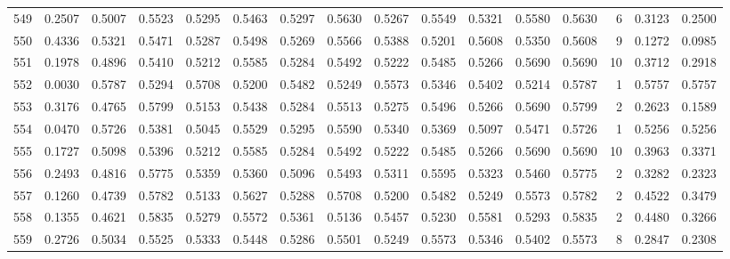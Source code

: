 \begin{tabular}{lrrrrrrrrrrrrrrr}
549 &      0.2507 &  0.5007 &  0.5523 &  0.5295 &  0.5463 &  0.5297 &  0.5630 &  0.5267 &  0.5549 &  0.5321 &   0.5580 &     0.5630 &      6 &                    0.3123 &                     0.2500 \\
550 &      0.4336 &  0.5321 &  0.5471 &  0.5287 &  0.5498 &  0.5269 &  0.5566 &  0.5388 &  0.5201 &  0.5608 &   0.5350 &     0.5608 &      9 &                    0.1272 &                     0.0985 \\
551 &      0.1978 &  0.4896 &  0.5410 &  0.5212 &  0.5585 &  0.5284 &  0.5492 &  0.5222 &  0.5485 &  0.5266 &   0.5690 &     0.5690 &     10 &                    0.3712 &                     0.2918 \\
552 &      0.0030 &  0.5787 &  0.5294 &  0.5708 &  0.5200 &  0.5482 &  0.5249 &  0.5573 &  0.5346 &  0.5402 &   0.5214 &     0.5787 &      1 &                    0.5757 &                     0.5757 \\
553 &      0.3176 &  0.4765 &  0.5799 &  0.5153 &  0.5438 &  0.5284 &  0.5513 &  0.5275 &  0.5496 &  0.5266 &   0.5690 &     0.5799 &      2 &                    0.2623 &                     0.1589 \\
554 &      0.0470 &  0.5726 &  0.5381 &  0.5045 &  0.5529 &  0.5295 &  0.5590 &  0.5340 &  0.5369 &  0.5097 &   0.5471 &     0.5726 &      1 &                    0.5256 &                     0.5256 \\
555 &      0.1727 &  0.5098 &  0.5396 &  0.5212 &  0.5585 &  0.5284 &  0.5492 &  0.5222 &  0.5485 &  0.5266 &   0.5690 &     0.5690 &     10 &                    0.3963 &                     0.3371 \\
556 &      0.2493 &  0.4816 &  0.5775 &  0.5359 &  0.5360 &  0.5096 &  0.5493 &  0.5311 &  0.5595 &  0.5323 &   0.5460 &     0.5775 &      2 &                    0.3282 &                     0.2323 \\
557 &      0.1260 &  0.4739 &  0.5782 &  0.5133 &  0.5627 &  0.5288 &  0.5708 &  0.5200 &  0.5482 &  0.5249 &   0.5573 &     0.5782 &      2 &                    0.4522 &                     0.3479 \\
558 &      0.1355 &  0.4621 &  0.5835 &  0.5279 &  0.5572 &  0.5361 &  0.5136 &  0.5457 &  0.5230 &  0.5581 &   0.5293 &     0.5835 &      2 &                    0.4480 &                     0.3266 \\
559 &      0.2726 &  0.5034 &  0.5525 &  0.5333 &  0.5448 &  0.5286 &  0.5501 &  0.5249 &  0.5573 &  0.5346 &   0.5402 &     0.5573 &      8 &                    0.2847 &                     0.2308 \\

\end{tabular}
